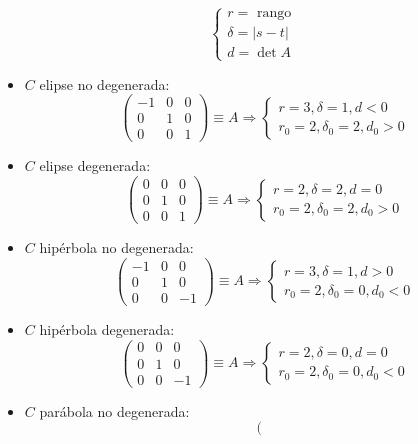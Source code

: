 \documentclass[10pt,a4paper,openright]{book}
\theoremstyle{break}
\begin{document}
$$\begin{cases} r = \mbox{ rango} \\ \delta = |s-t| \\ d = \det A
\end{cases}$$
\begin{itemize}
\item $C$ elipse no degenerada:
$$\left(\begin{array}{c|cc}
-1 & 0 & 0 \\
\hline
0 & 1  & 0  \\
0 &  0 &1
\end{array}
\right) \equiv A \Rightarrow \begin{cases} r= 3 , \delta = 1, d < 0 \\ r_0 = 2, \delta_0 = 2, d_0 >0 \end{cases}$$
\item $C$ elipse degenerada:
$$\left(\begin{array}{c|cc}
0 & 0 & 0 \\
\hline
0 & 1  & 0  \\
0 &  0 &1
\end{array}
\right) \equiv A \Rightarrow \begin{cases} r= 2 , \delta = 2, d = 0 \\ r_0 = 2, \delta_0 = 2, d_0 >0 \end{cases}$$
\item $C$ hipérbola no degenerada:
$$\left(\begin{array}{c|cc}
-1 & 0 & 0 \\
\hline
0 & 1  & 0  \\
0 &  0 & -1
\end{array}
\right) \equiv A \Rightarrow \begin{cases} r= 3 , \delta = 1, d > 0 \\ r_0 = 2, \delta_0 = 0, d_0 < 0 \end{cases}$$
\item $C$ hipérbola degenerada:
$$\left(\begin{array}{c|cc}
0 & 0 & 0 \\
\hline
0 & 1  & 0  \\
0 &  0 & -1
\end{array}
\right) \equiv A \Rightarrow \begin{cases} r= 2 , \delta = 0, d = 0 \\ r_0 = 2, \delta_0 = 0, d_0 < 0 \end{cases}$$
\item $C$ parábola no degenerada:
$$\left(\begin{array}{c|cc}

\end{array}$$
\end{itemize}
\end{document}
